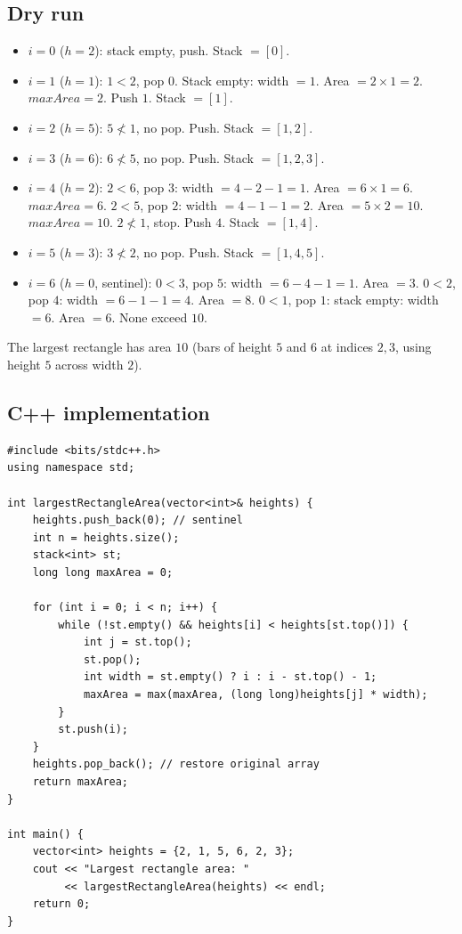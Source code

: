 \subsection*{Dry run}


\begin{itemize}
  \item $i=0$ ($h=2$): stack empty, push. Stack $=[0]$.
  \item $i=1$ ($h=1$): $1<2$, pop $0$. Stack empty: width $=1$. Area
        $=2\times1=2$. $\textit{maxArea}=2$. Push $1$. Stack $=[1]$.
  \item $i=2$ ($h=5$): $5 \not< 1$, no pop. Push. Stack $=[1,2]$.
  \item $i=3$ ($h=6$): $6 \not< 5$, no pop. Push. Stack $=[1,2,3]$.
  \item $i=4$ ($h=2$): $2<6$, pop $3$: width $=4-2-1=1$. Area
        $=6\times1=6$. $\textit{maxArea}=6$. $2<5$, pop $2$: width
        $=4-1-1=2$. Area $=5\times2=10$. $\textit{maxArea}=10$. $2
        \not< 1$, stop. Push $4$. Stack $=[1,4]$.
  \item $i=5$ ($h=3$): $3 \not< 2$, no pop. Push. Stack $=[1,4,5]$.
  \item $i=6$ ($h=0$, sentinel): $0<3$, pop $5$: width $=6-4-1=1$. Area
        $=3$. $0<2$, pop $4$: width $=6-1-1=4$. Area $=8$. $0<1$, pop
        $1$: stack empty: width $=6$. Area $=6$. None exceed $10$.
\end{itemize}

The largest rectangle has area $\boxed{10}$ (bars of height $5$ and $6$
at indices $2,3$, using height $5$ across width $2$).

\subsection*{C++ implementation}

\begin{lstlisting}
#include <bits/stdc++.h>
using namespace std;

int largestRectangleArea(vector<int>& heights) {
    heights.push_back(0); // sentinel
    int n = heights.size();
    stack<int> st;
    long long maxArea = 0;

    for (int i = 0; i < n; i++) {
        while (!st.empty() && heights[i] < heights[st.top()]) {
            int j = st.top();
            st.pop();
            int width = st.empty() ? i : i - st.top() - 1;
            maxArea = max(maxArea, (long long)heights[j] * width);
        }
        st.push(i);
    }
    heights.pop_back(); // restore original array
    return maxArea;
}

int main() {
    vector<int> heights = {2, 1, 5, 6, 2, 3};
    cout << "Largest rectangle area: "
         << largestRectangleArea(heights) << endl;
    return 0;
}
\end{lstlisting}

